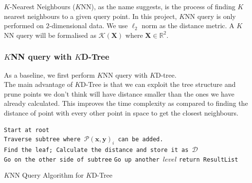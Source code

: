 $K$-Nearest Neighbours ($K$NN), as the name suggests, is the process of finding $K$ nearest neighbours to a given query point. In this project, $K$NN query is only performed on $2$-dimensional data. We use $\ell_2$ norm as the distance metric. A $K$NN query will be formalised as $\mathcal{K}(\boldsymbol{X})$ where $\boldsymbol{X}\in\mathbb{R}^2$.

\subsubsection{$K$NN query with $K$D-Tree}
As a baseline, we first perform $K$NN query with $K$D-tree.\\
The main advantage of $K$D-Tree is that we can exploit the tree structure and prune points we don't think will have distance smaller than the ones we have already calculated. This improves the time complexity as compared to finding the distance of point with every other point in space to get the closest neighbours. 


\begin{algorithm}[H]
    \SetAlgoLined
    {
        \texttt{Start at root}\\
        \texttt{Traverse subtree where $\mathcal{P}(\boldsymbol{x}, \boldsymbol{y})_i$ can be added.}\\
        \texttt{Find the leaf; Calculate the distance and store it as $\mathcal{D}$}\\
            {
                    {
                        \texttt{Go on the other side of subtree} 
                    }
                        {
                            \texttt{Go up another $level$}
                        }
            }
            {
                \texttt{return ResultList}
            }
        
    }
    \caption{$K$NN Query Algorithm for $K$D-Tree}
    \label{$K$NN_Query_Algorithm_$K$D-Tree}
\end{algorithm}

